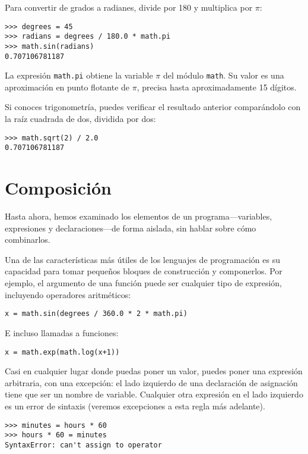 \documentclass[12pt,letterpaper]{book}
\begin{document}
Para convertir de grados a radianes, divide por 180 y multiplica por $\pi$:

\begin{lstlisting}
>>> degrees = 45
>>> radians = degrees / 180.0 * math.pi
>>> math.sin(radians)
0.707106781187
\end{lstlisting}

La expresión \texttt{math.pi} obtiene la variable $\pi$ del módulo \texttt{math}. Su valor es una aproximación en punto flotante de $\pi$, precisa hasta aproximadamente 15 dígitos.

Si conoces trigonometría, puedes verificar el resultado anterior comparándolo con la raíz cuadrada de dos, dividida por dos:

\begin{lstlisting}
>>> math.sqrt(2) / 2.0
0.707106781187
\end{lstlisting}

\section{Composición}

Hasta ahora, hemos examinado los elementos de un programa—variables, expresiones y declaraciones—de forma aislada, sin hablar sobre cómo combinarlos.

Una de las características más útiles de los lenguajes de programación es su capacidad para tomar pequeños bloques de construcción y componerlos. Por ejemplo, el argumento de una función puede ser cualquier tipo de expresión, incluyendo operadores aritméticos:

\begin{lstlisting}
x = math.sin(degrees / 360.0 * 2 * math.pi)
\end{lstlisting}

E incluso llamadas a funciones:

\begin{lstlisting}
x = math.exp(math.log(x+1))
\end{lstlisting}

Casi en cualquier lugar donde puedas poner un valor, puedes poner una expresión arbitraria, con una excepción: el lado izquierdo de una declaración de asignación tiene que ser un nombre de variable. Cualquier otra expresión en el lado izquierdo es un error de sintaxis (veremos excepciones a esta regla más adelante).

\begin{lstlisting}
>>> minutes = hours * 60
>>> hours * 60 = minutes
SyntaxError: can't assign to operator
\end{lstlisting}
\end{document}
